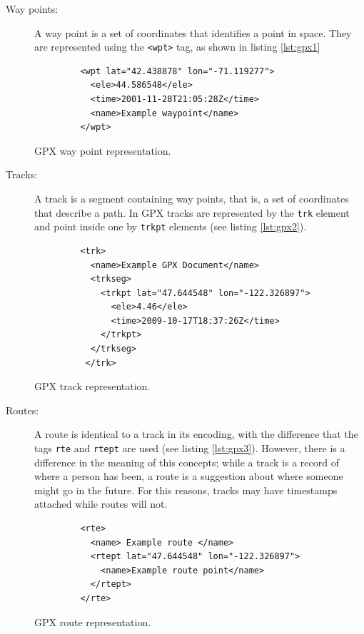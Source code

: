\begin{description}
\item[Way points:] A way point is a set of coordinates that identifies a point in space. They are represented using the \texttt{<wpt>} tag, as shown in listing \ref{lst:gpx1}

\begin{listing}[ht]\centering
  \begin{minipage}{.5\textwidth}
    \begin{verbatim}
	     <wpt lat="42.438878" lon="-71.119277">
	       <ele>44.586548</ele>
	       <time>2001-11-28T21:05:28Z</time>
	       <name>Example waypoint</name>
	     </wpt>
    \end{verbatim}
  \end{minipage}
  \caption{GPX way point representation.}\label{lst:gpx1}
\end{listing}


\item[Tracks:] A track is a segment containing way points, that is, a set of coordinates that describe a path. In GPX tracks are represented by the \texttt{trk} element and point inside one by \texttt{trkpt} elements (see listing \ref{lst:gpx2}).

\begin{listing}[ht]\centering
  \begin{minipage}{.5\textwidth}
    \begin{verbatim}
	     <trk>
	       <name>Example GPX Document</name>
	       <trkseg>
	         <trkpt lat="47.644548" lon="-122.326897">
	           <ele>4.46</ele>
	           <time>2009-10-17T18:37:26Z</time>
	         </trkpt>
	       </trkseg>
	      </trk>
    \end{verbatim}
  \end{minipage}
  \caption{GPX track representation.}\label{lst:gpx2}
\end{listing}

\item[Routes:] A route is identical to a track in its encoding, with the difference that the tags \texttt{rte} and \texttt{rtept} are used (see listing \ref{lst:gpx3}). However, there is a difference in the meaning of this concepts; while a track is a record of where a person has been, a route is a suggestion about where someone might go in the future. For this reasons, tracks may have timestamps attached while routes will not.

\begin{listing}[ht]\centering
  \begin{minipage}{.5\textwidth}
    \begin{verbatim}
	     <rte>
	       <name> Example route </name>
	       <rtept lat="47.644548" lon="-122.326897">
	         <name>Example route point</name>
	       </rtept>
	     </rte>
    \end{verbatim}
  \end{minipage}
  \caption{GPX route representation.}\label{lst:gpx3}
\end{listing}

\end{description}

